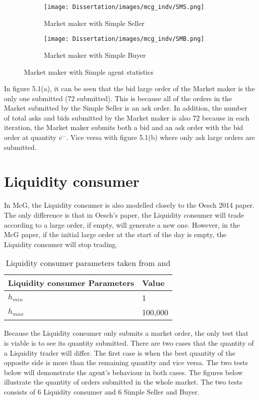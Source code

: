 \begin{figure}[h]
  \begin{subfigure}[b]{0.5\textwidth}
    \texttt{[image: Dissertation/images/mcg\_indv/SMS.png]}
    \caption{Market maker with Simple Seller}
    \label{fig:1}
  \end{subfigure}
  \begin{subfigure}[b]{0.5\textwidth}
    \texttt{[image: Dissertation/images/mcg\_indv/SMB.png]}
    \caption{Market maker with Simple Buyer}
    \label{fig:2}
  \end{subfigure}
\caption{Market maker with Simple agent statistics} 
\end{figure}

In figure 5.1(a), it can be seen that the bid large order of the Market maker is the only one submitted (72 submitted). This is because all of the orders in the Market submitted by the Simple Seller is an ask order. In addition, the number of total asks and bids submitted by the Market maker is also 72 because in each iteration, the Market maker submits both a bid and an ask order with the bid order at quantity $v^-$. Vice versa with figure 5.1(b) where only ask large orders are submitted. 

\section{Liquidity consumer} 
In McG, the Liquidity consumer is also modelled closely to the Oesch 2014 \cite{Oesch} paper. The only difference is that in Oesch's paper, the Liquidity consumer will trade according to a large order, if empty, will generate a new one. However, in the McG paper, if the initial large order at the start of the day is empty, the Liquidity consumer will stop trading. 
\begin{table}[h]
\centering
\begin{tabular}{ |m||p{4cm}|} 
\hline
\textbf{Liquidity consumer Parameters}& \textbf{Value} \\
\hline
\hline
$h_{min}$ & 1 \\ 
\hline
$h_{max}$ & 100,000\\ 
\hline
\end{tabular}
\caption{Liquidity consumer parameters taken from \cite{McGroarty} and  \cite{Oesch}} 
\end{table}
\FloatBarrier 

Because the Liquidity consumer only submits a market order, the only test that is viable is to see its quantity submitted. There are two cases that the quantity of a Liquidity trader will differ. The first case is when the best quantity of the opposite side is more than the remaining quantity and vice versa. The two tests below will demonstrate the agent's behaviour in both cases. The figures below illustrate the quantity of orders submitted in the whole market. The two tests consists of 6 Liquidity consumer and 6 Simple Seller and Buyer. 

